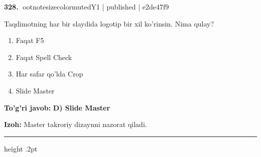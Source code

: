 \documentclass[10pt,a4paper]{article}
\begin{document}
\textbf{\color{ink}328.} {ootnotesizecolor{muted}Y1 | published | e2de47f9}
\par
Taqdimotning har bir slaydida logotip bir xil ko'rinsin. Nima qulay?
\begin{enumerate}[label=\Alph*),leftmargin=9mm]
\item Faqat F5
\item Faqat Spell Check
\item Har safar qo'lda Crop
\item Slide Master
\end{enumerate}
\begin{tcolorbox}[enhanced,breakable,colback=teal!4,colframe=teal!55!black,boxrule=0.45pt,arc=1.2mm,left=2.8mm,right=2.8mm,top=2mm,bottom=2mm]
\textbf{\color{teal}To'g'ri javob:} \textbf{D) Slide Master}
\par\smallskip
\textbf{Izoh:} Master takroriy dizaynni nazorat qiladi.
\end{tcolorbox}
\vspace{2mm}\hrule height .2pt\vspace{2mm}
\end{document}
